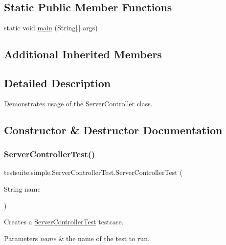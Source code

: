 \subsection*{Static Public Member Functions}
\begin{DoxyCompactItemize}
\item 
static void \mbox{\hyperlink{classtestsuite_1_1simple_1_1_server_controller_test_a8aeb6ae4588ab63220794d7ead41ce35}{main}} (String\mbox{[}$\,$\mbox{]} args)
\end{DoxyCompactItemize}
\subsection*{Additional Inherited Members}


\subsection{Detailed Description}
Demonstrates usage of the Server\+Controller class. 

\subsection{Constructor \& Destructor Documentation}
\mbox{\label{classtestsuite_1_1simple_1_1_server_controller_test_aed48ef46008c20609af703e32af46073}} 
\subsubsection{\texorpdfstring{Server\+Controller\+Test()}{ServerControllerTest()}}
{\footnotesize\ttfamily testsuite.\+simple.\+Server\+Controller\+Test.\+Server\+Controller\+Test (\begin{DoxyParamCaption}\item[{String}]{name }\end{DoxyParamCaption})}

Creates a \mbox{\hyperlink{classtestsuite_1_1simple_1_1_server_controller_test}{Server\+Controller\+Test}} testcase.


\begin{DoxyParams}{Parameters}
{\em name} & the name of the test to run. \\
\hline
\end{DoxyParams}


